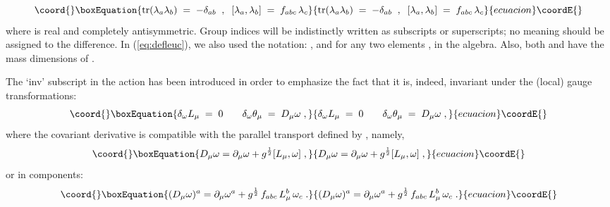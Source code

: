 \documentclass[a4paper,12pt]{article}
\begin{document}
\begin{equation}\coord{}\boxEquation{\label{eq:conv}
{\rm tr} (\lambda_a \lambda_b) \;=\; - \delta_{a b}\;\;,\;\;
[\lambda_a , \lambda_b ] \;=\; f_{a b c} \, \lambda_c
}{{\rm tr} (\lambda_a \lambda_b) \;=\; - \delta_{a b}\;\;,\;\;
[\lambda_a , \lambda_b ] \;=\; f_{a b c} \, \lambda_c
}{ecuacion}\coordE{}\end{equation}
where \coordHE{} is real and completely antisymmetric. Group indices
will be indistinctly written as subscripts or superscripts; no meaning
should be assigned to the difference.  In (\ref{eq:defleuc}), we also
used the notation: \coordHE{}, and \coordHE{} for any two elements \coordHE{}, \coordHE{} in the algebra. Also,
both \coordHE{} and \myHighlight{$\theta$}\coordHE{} have the mass dimensions of \coordHE{}.

The `inv' subscript in the action has been introduced in order to
emphasize the fact that it is, indeed, invariant under the (local)
gauge transformations:
\begin{equation}\coord{}\boxEquation{\label{eq:pgtrns}
\delta_\omega L_\mu \;=\; 0 \;\;\;\;\;\;\;
\delta_\omega \theta_\mu \;=\; D_\mu \omega \;,
}{\delta_\omega L_\mu \;=\; 0 \;\;\;\;\;\;\;
\delta_\omega \theta_\mu \;=\; D_\mu \omega \;,
}{ecuacion}\coordE{}\end{equation}
where the covariant derivative is compatible with the parallel
transport defined by \coordHE{}, namely,
\begin{equation}\coord{}\boxEquation{
D_\mu \omega = \partial_\mu \omega + g^{\frac{1}{2}} [L_\mu , \omega]
\;,
}{
D_\mu \omega = \partial_\mu \omega + g^{\frac{1}{2}} [L_\mu , \omega]
\;,
}{ecuacion}\coordE{}\end{equation}
or in components:
\begin{equation}\coord{}\boxEquation{
(D_\mu \omega)^a = \partial_\mu \omega^a + g^{\frac{1}{2}}
\, f_{a b c} \, L_\mu^b \,  \omega_c \;.
}{
(D_\mu \omega)^a = \partial_\mu \omega^a + g^{\frac{1}{2}}
\, f_{a b c} \, L_\mu^b \,  \omega_c \;.
}{ecuacion}\coordE{}\end{equation}
\end{document}
